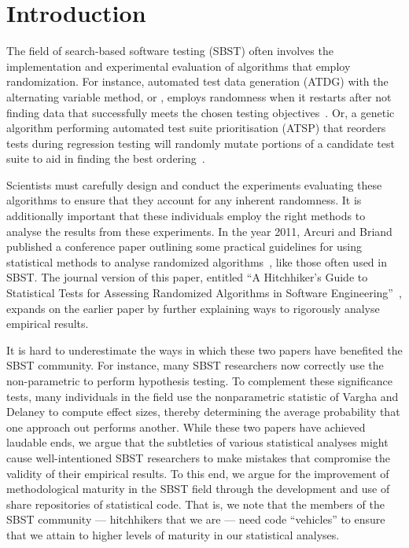
\section{Introduction}
\label{sec:introduction}

The field of search-based software testing (SBST) often involves the implementation and experimental evaluation of
algorithms that employ randomization. For instance, automated test data generation (ATDG) with the alternating variable
method, or \AVM, employs randomness when it restarts after not finding data that successfully meets the chosen
testing objectives~\cite{McMinn2015}. Or, a genetic algorithm performing automated test suite prioritisation (ATSP) that
reorders tests during regression testing will randomly mutate portions of a candidate test suite to aid in
finding the best ordering~\cite{Walcott2006}.

Scientists must carefully design and conduct the experiments evaluating these algorithms to ensure that they account for
any inherent randomness. It is additionally important that these individuals employ the right methods to analyse the results
from these experiments. In the year 2011, Arcuri and Briand published a conference paper outlining some practical
guidelines for using statistical methods to analyse randomized algorithms~\cite{Arcuri2011}, like those often used in
SBST. The journal version of this paper, entitled ``A Hitchhiker's Guide to Statistical Tests for
Assessing Randomized Algorithms in Software Engineering''~\cite{Arcuri2014}, expands on the earlier paper 
by further explaining ways to rigorously analyse empirical results.

It is hard to underestimate the ways in which these two papers have benefited the SBST community. For instance, many
SBST researchers now correctly use the non-parametric \wilcoxon to perform hypothesis testing. To complement these
significance tests, many individuals in the field use the nonparametric \atwelve statistic of Vargha and Delaney
\cite{Vargha2000} to compute effect sizes, thereby determining the average probability that one approach out performs
another. While these two papers have achieved laudable ends, we argue that the subtleties of various statistical
analyses might cause well-intentioned SBST researchers to make mistakes that compromise the validity of their empirical
results. To this end, we argue for the improvement of methodological maturity in the SBST field through the development
and use of share repositories of statistical code. That is, we note that the members of the SBST community ---
hitchhikers that we are --- need code ``vehicles'' to ensure that we attain to higher levels of maturity in our
statistical analyses.

